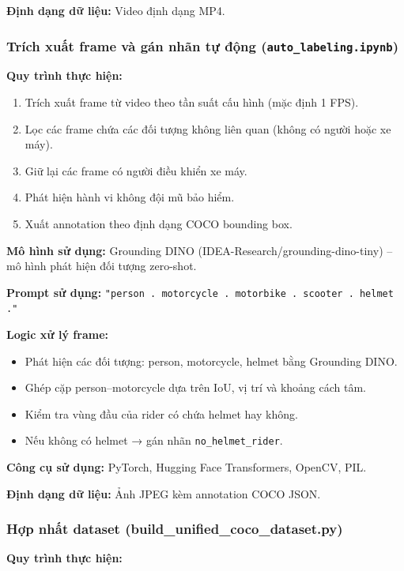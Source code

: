 \textbf{Định dạng dữ liệu:}
Video định dạng MP4.

\subsubsection{Trích xuất frame và gán nhãn tự động (\texttt{auto\_labeling.ipynb})}

\textbf{Quy trình thực hiện:}

\begin{enumerate}
    \item Trích xuất frame từ video theo tần suất cấu hình (mặc định 1 FPS).
    \item Lọc các frame chứa các đối tượng không liên quan (không có người hoặc xe máy).
    \item Giữ lại các frame có người điều khiển xe máy.
    \item Phát hiện hành vi không đội mũ bảo hiểm.
    \item Xuất annotation theo định dạng COCO bounding box.
\end{enumerate}

\textbf{Mô hình sử dụng:}
Grounding DINO \cite{liu2023grounding} (IDEA-Research/grounding-dino-tiny) – mô hình phát hiện đối tượng zero-shot.

\textbf{Prompt sử dụng:}
\texttt{"person . motorcycle . motorbike . scooter . helmet ."}

\textbf{Logic xử lý frame:}
\begin{itemize}
    \item Phát hiện các đối tượng: person, motorcycle, helmet bằng Grounding DINO.
    \item Ghép cặp person–motorcycle dựa trên IoU, vị trí và khoảng cách tâm.
    \item Kiểm tra vùng đầu của rider có chứa helmet hay không.
    \item Nếu không có helmet → gán nhãn \texttt{no\_helmet\_rider}.
\end{itemize}

\textbf{Công cụ sử dụng:}
PyTorch, Hugging Face Transformers, OpenCV, PIL.

\textbf{Định dạng dữ liệu:}
Ảnh JPEG kèm annotation COCO JSON.

\subsubsection{Hợp nhất dataset (build\_unified\_coco\_dataset.py)}

\textbf{Quy trình thực hiện:}

